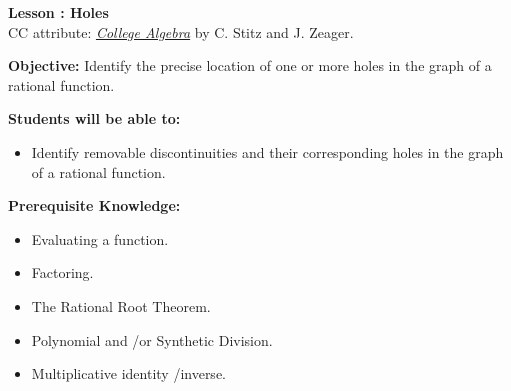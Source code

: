 \documentclass[12pt]{article}
\theoremstyle{definition}
\begin{document}
{\bf \large Lesson : Holes}
\\ CC attribute: \href{http://www.stitz-zeager.com}{\it{College Algebra}} by C. Stitz and J. Zeager. 
\hfill \doclicenseImage[imagewidth=5em]\\
\par
{\bf Objective:} Identify the precise location of one or more holes in the graph of a rational function.\\
\par
{\bf Students will be able to:}
\begin{itemize}
	\item Identify removable discontinuities and their corresponding holes in the graph of a rational function.
\end{itemize}
{\bf Prerequisite Knowledge:}
\begin{itemize}
	\item Evaluating a function.
	\item Factoring.
	\item The Rational Root Theorem.
	\item Polynomial and \slash or Synthetic Division.
 	\item Multiplicative identity \slash inverse.
\end{itemize}
\hrulefill
\end{document}
